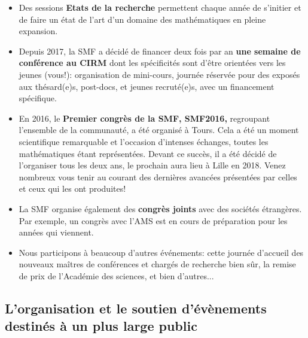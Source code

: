 \begin{itemize}
 \item
Des sessions {\bf Etats de la recherche}   permettent chaque ann\'ee  de s'initier  et de faire un \og \'etat de l'art\fg{} d'un domaine des math\'{e}matiques en pleine expansion. 
\item
Depuis 2017, la SMF a d\'ecid\'e de financer deux fois par an {\bf une semaine de conf\'erence au CIRM} dont les sp\'ecificit\'es sont d'\^etre orient\'ees vers les jeunes (vous!): organisation de mini-cours, journ\'ee r\'eserv\'ee pour des expos\'es aux th\'esard(e)s, post-docs, et jeunes recrut\'e(e)s, avec un financement sp\'ecifique.
\item
En 2016, le {\bf Premier congr\`es de la SMF, SMF2016,} regroupant l'ensemble de la communaut\'e, a \'et\'e organis\'e \`a Tours. Cela a \'et\'e un moment scientifique remarquable  et l'occasion d'intenses \'echanges, toutes les math\'ematiques \'etant repr\'esent\'ees. Devant ce succ\`es, il a \'et\'e  d\'ecid\'e de l'organiser tous les deux ans, le prochain aura lieu \`a Lille en 2018. Venez nombreux vous tenir au courant des derni\`eres avanc\'ees pr\'esent\'ees par celles et ceux qui les ont produites!

\item
La SMF organise \'egalement des {\bf congr\`es joints} avec des soci\'et\'es \'etrang\`eres. Par exemple, un congr\`es avec l'AMS  est en cours de pr\'eparation pour les ann\'ees qui viennent. 

\item Nous participons \`a beaucoup d'autres \'ev\'enements: cette journ\'ee d'accueil des nouveaux ma\^itres de
conf\'erences et charg\'es de recherche bien s\^ur, la remise de prix de l'Acad\'emie des sciences, et bien d'autres...

\end{itemize}


\subsection*{L'organisation et le soutien d'\'{e}v\`{e}nements destin\'es \`a un plus large public} 


